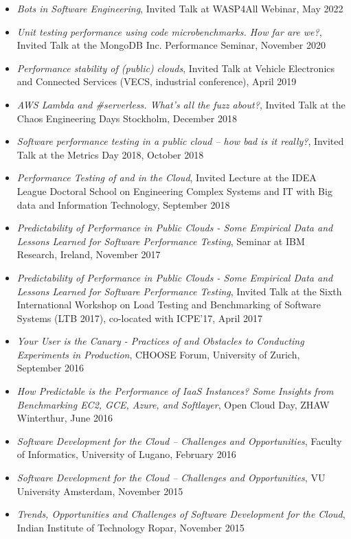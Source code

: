 \documentclass[paper=letter,fontsize=11pt]{scrartcl} %
\begin{document}
\begin{itemize}
  \item \emph{Bots in Software Engineering}, Invited Talk at WASP4All Webinar, May 2022
  \item \emph{Unit testing performance using code microbenchmarks. How far are we?}, Invited Talk at the MongoDB Inc. Performance Seminar, November 2020
	\item \emph{Performance stability of (public) clouds}, Invited Talk at Vehicle Electronics and Connected Services (VECS, industrial conference), April 2019
	\item \emph{AWS Lambda and \#serverless. What’s all the fuzz about?}, Invited Talk at the Chaos Engineering Days Stockholm, December 2018
		\item \emph{Software performance testing in a public cloud – how bad is it really?}, Invited Talk at the Metrics Day 2018, October 2018
		\item \emph{Performance Testing of and in the Cloud}, Invited Lecture at the IDEA League Doctoral School on Engineering Complex Systems and IT with Big data and Information Technology, September 2018
\item \emph{Predictability of Performance in Public Clouds - Some Empirical Data and Lessons Learned for Software Performance Testing}, Seminar at IBM Research, Ireland, November 2017
\item \emph{Predictability of Performance in Public Clouds - Some Empirical Data and Lessons Learned for Software Performance Testing}, Invited Talk at the Sixth International Workshop on Load Testing and Benchmarking of Software Systems (LTB 2017), co-located with ICPE'17, April 2017
\item \emph{Your User is the Canary - Practices of and Obstacles to Conducting Experiments in Production}, CHOOSE Forum, University of Zurich, September 2016
\item \emph{How Predictable is the Performance of IaaS Instances? Some Insights from Benchmarking EC2, GCE, Azure, and Softlayer}, Open Cloud Day, ZHAW Winterthur, June 2016
\item \emph{Software Development for the Cloud – Challenges and Opportunities}, Faculty of Informatics, University of Lugano, February 2016
\item \emph{Software Development for the Cloud – Challenges and Opportunities}, VU University Amsterdam, November 2015
\item \emph{Trends, Opportunities and Challenges of Software Development for the Cloud}, Indian Institute of Technology Ropar, November 2015

\end{itemize}
\end{document}
